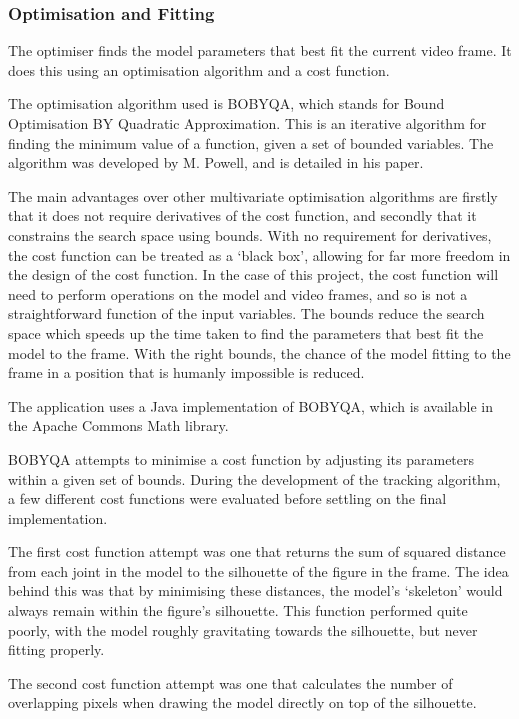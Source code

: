 \subsubsection{Optimisation and Fitting}

The optimiser finds the model parameters that best fit the current video frame. It does this using an optimisation algorithm and a cost function.

The optimisation algorithm used is BOBYQA, which stands for Bound Optimisation BY Quadratic Approximation. This is an iterative algorithm for finding the minimum value of a function, given a set of bounded variables. The algorithm was developed by M. Powell, and is detailed in his paper\cite{bobyqa}.

The main advantages over other multivariate optimisation algorithms are firstly that it does not require derivatives of the cost function, and secondly that it constrains the search space using bounds. With no requirement for derivatives, the cost function can be treated as a `black box', allowing for far more freedom in the design of the cost function. In the case of this project, the cost function will need to perform operations on the model and video frames, and so is not a straightforward function of the input variables. The bounds reduce the search space which speeds up the time taken to find the parameters that best fit the model to the frame. With the right bounds, the chance of the model fitting to the frame in a position that is humanly impossible is reduced.

The application uses a Java implementation of BOBYQA, which is available in the Apache Commons Math library\cite{apachemath}.

BOBYQA attempts to minimise a cost function by adjusting its parameters within a given set of bounds. During the development of the tracking algorithm, a few different cost functions were evaluated before settling on the final implementation.

The first cost function attempt was one that returns the sum of squared distance from each joint in the model to the silhouette of the figure in the frame. The idea behind this was that by minimising these distances, the model's `skeleton' would always remain within the figure's silhouette. This function performed quite poorly, with the model roughly gravitating towards the silhouette, but never fitting properly.

The second cost function attempt was one that calculates the number of overlapping pixels when drawing the model directly on top of the silhouette.
